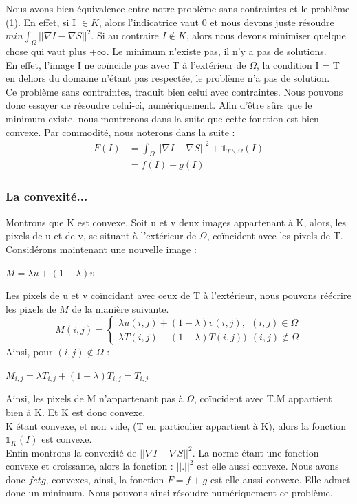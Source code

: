 Nous avons bien équivalence entre notre problème sans contraintes et le problème (1). En effet, si I $\in K$, alors l'indicatrice vaut 0 et nous devons juste résoudre $min \int_\Omega ||\nabla I - \nabla S||^2 $. Si au contraire $I \notin K$, alors nous devons minimiser quelque chose qui vaut plus $+\infty$. Le minimum n'existe pas, il n'y a pas de solutions.\\
 En effet, l'image I ne coïncide pas avec T à l'extérieur de $\Omega$,  la condition I = T en dehors du domaine n'étant pas respectée, le problème n'a pas de solution. \\
 Ce problème sans contraintes, traduit bien celui avec contraintes. Nous pouvons donc essayer de résoudre celui-ci, numériquement. Afin d'être sûrs que le minimum existe, nous montrerons dans la suite que cette fonction est bien convexe. 
 Par commodité, nous noterons dans la suite : 
 \begin{equation*}
 \begin{aligned}
 F(I) &=   \int_\Omega ||\nabla I - \nabla S||^2 + \mathbb{1} _{T\backslash \Omega } (I) \\
 & = f(I)+ g(I)
 \end{aligned}
 \end{equation*}
\subsubsection{La convexité...}
Montrons que K est convexe. 
Soit u et v deux images appartenant à K, alors, les pixels de u et de v, se situant à l'extérieur de $\Omega$, coïncident avec les pixels de T. \\
Considérons maintenant une nouvelle image : 
\begin{center}
$M = \lambda u+(1-\lambda)v$
\end{center}
Les pixels de u et v coïncidant avec ceux de T à l'extérieur, nous pouvons réécrire les pixels de $M$ de la manière suivante. \\

\begin{equation*} 
M (i,j) = 
\left\{
\begin{aligned}
\lambda u(i,j) +(1-\lambda) v(i,j), \ \ (i,j) \in \Omega\\
\lambda T(i,j) +(1-\lambda )T(i,j))  \ \ (i,j)\notin \Omega
\end{aligned}
\right.
\end{equation*}
Ainsi, pour $(i,j) \notin \Omega$ : \\
\begin{center}
$M_{i,j} = \lambda T_{i,j}+(1-\lambda) T_{i,j} = T_{i,j}$
\end{center}
Ainsi, les pixels de M n'appartenant pas à $\Omega$, coïncident avec T.M appartient bien à K. Et K est donc convexe.\\
K étant convexe, et non vide, (T en particulier appartient à K), alors la fonction $\mathbb{1}_K(I)$ est convexe. \\
Enfin montrons la convexité de $||\nabla I-\nabla S||^2$.
La norme étant une fonction convexe et croissante, alors la fonction : $||.||^2$ est elle aussi convexe. 
Nous avons donc $f et g$, convexes, ainsi, la fonction $F =f+g$ est elle aussi convexe. Elle admet donc un minimum. Nous pouvons ainsi résoudre numériquement ce problème.
